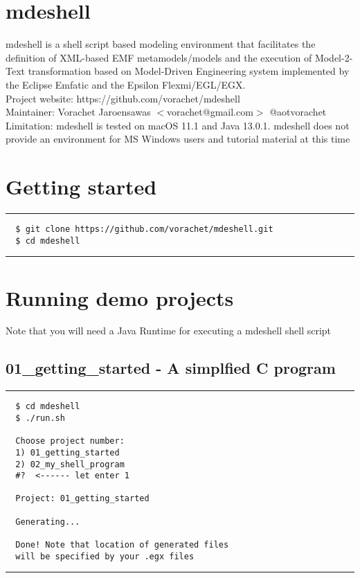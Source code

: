 \documentclass[12pt]{article}
\begin{document}

\section*{mdeshell}

mdeshell is a shell script based modeling environment that facilitates the definition of XML-based EMF metamodels/models and the execution of Model-2-Text transformation based on Model-Driven Engineering system implemented by the Eclipse Emfatic and the Epsilon Flexmi/EGL/EGX.  \\


Project website: https://github.com/vorachet/mdeshell \\
Maintainer: Vorachet Jaroensawas $<$vorachet@gmail.com$>$ @aotvorachet \\

Limitation: mdeshell is tested on macOS 11.1 and Java 13.0.1. mdeshell does not provide an environment for MS Windows users and tutorial material at this time 



\section*{Getting started}
\noindent\rule{8cm}{0.4pt}
\begin{lstlisting}
  $ git clone https://github.com/vorachet/mdeshell.git
  $ cd mdeshell
\end{lstlisting}
\noindent\rule{8cm}{0.4pt}


\section*{Running demo projects}

Note that you will need a Java Runtime for executing a mdeshell shell script 

\subsection*{01\_getting\_started - A simplfied C program}
\noindent\rule{8cm}{0.4pt}
\begin{lstlisting}
  $ cd mdeshell
  $ ./run.sh 

  Choose project number:
  1) 01_getting_started
  2) 02_my_shell_program
  #?  <------ let enter 1

  Project: 01_getting_started 

  Generating...

  Done! Note that location of generated files 
  will be specified by your .egx files
\end{lstlisting}
\noindent\rule{8cm}{0.4pt}
\end{document}
